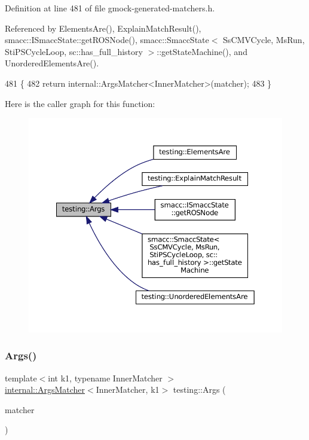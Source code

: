 Definition at line 481 of file gmock-\/generated-\/matchers.\+h.



Referenced by Elements\+Are(), Explain\+Match\+Result(), smacc\+::\+I\+Smacc\+State\+::get\+R\+O\+S\+Node(), smacc\+::\+Smacc\+State$<$ Ss\+C\+M\+V\+Cycle, Ms\+Run, Sti\+P\+S\+Cycle\+Loop, sc\+::has\+\_\+full\+\_\+history $>$\+::get\+State\+Machine(), and Unordered\+Elements\+Are().


\begin{DoxyCode}
481                                   \{
482   \textcolor{keywordflow}{return} internal::ArgsMatcher<InnerMatcher>(matcher);
483 \}
\end{DoxyCode}
Here is the caller graph for this function\+:
\nopagebreak
\begin{figure}[H]
\begin{center}
\leavevmode
\includegraphics[width=350pt]{namespacetesting_aaca153f67b689b8b9d5b8c67ecf8cee4_icgraph}
\end{center}
\end{figure}
\mbox{\label{namespacetesting_af67bac6da407df7586f60cfa2c9b602d}} 
\subsubsection{\texorpdfstring{Args()}{Args()}\hspace{0.1cm}{\footnotesize\ttfamily [2/11]}}
{\footnotesize\ttfamily template$<$int k1, typename Inner\+Matcher $>$ \\
\hyperlink{classtesting_1_1internal_1_1ArgsMatcher}{internal\+::\+Args\+Matcher}$<$Inner\+Matcher, k1$>$ testing\+::\+Args (\begin{DoxyParamCaption}\item[{const Inner\+Matcher \&}]{matcher }\end{DoxyParamCaption})\hspace{0.3cm}{\ttfamily [inline]}}



